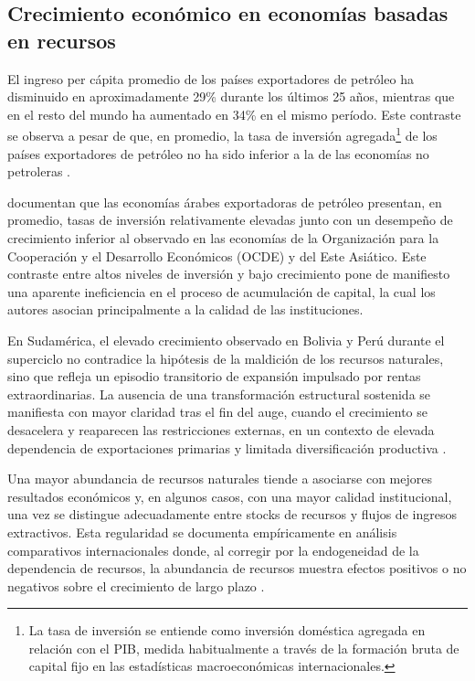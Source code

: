 \documentclass[../../TFM.tex]{subfiles}
\begin{document}
	\subsection{Crecimiento económico en economías basadas en recursos}
	\label{subsec:crecimiento-economico}
	
	El ingreso per cápita promedio de los países exportadores de petróleo ha disminuido en aproximadamente 29\% durante los últimos 25 años, mientras que en el resto del mundo ha aumentado en 34\% en el mismo período. Este contraste se observa a pesar de que, en promedio, la tasa de inversión agregada\footnote{La tasa de inversión se entiende como inversión doméstica agregada en relación con el PIB, medida habitualmente a través de la formación bruta de capital fijo en las estadísticas macroeconómicas internacionales.} de los países exportadores de petróleo no ha sido inferior a la de las economías no petroleras \parencite{Nili2007}.
	
	\textcite{Sala-i-Martin2002} documentan que las economías árabes exportadoras de petróleo presentan, en promedio, tasas de inversión relativamente elevadas junto con un desempeño de crecimiento inferior al observado en las economías de la Organización para la Cooperación y el Desarrollo Económicos (OCDE) y del Este Asiático. Este contraste entre altos niveles de inversión y bajo crecimiento pone de manifiesto una aparente ineficiencia en el proceso de acumulación de capital, la cual los autores asocian principalmente a la calidad de las instituciones.
	
	En Sudamérica, el elevado crecimiento observado en Bolivia y Perú durante el superciclo no contradice la hipótesis de la maldición de los recursos naturales, sino que refleja un episodio transitorio de expansión impulsado por rentas extraordinarias. La ausencia de una transformación estructural sostenida se manifiesta con mayor claridad tras el fin del auge, cuando el crecimiento se desacelera y reaparecen las restricciones externas, en un contexto de elevada dependencia de exportaciones primarias y limitada diversificación productiva \parencite{Agramont-Lechn2024}.
	
	Una mayor abundancia de recursos naturales tiende a asociarse con mejores resultados económicos y, en algunos casos, con una mayor calidad institucional, una vez se distingue adecuadamente entre stocks de recursos y flujos de ingresos extractivos. Esta regularidad se documenta empíricamente en análisis comparativos internacionales donde, al corregir por la endogeneidad de la dependencia de recursos, la abundancia de recursos muestra efectos positivos o no negativos sobre el crecimiento de largo plazo \parencite{Brunnschweiler2008}.
	
\end{document}
